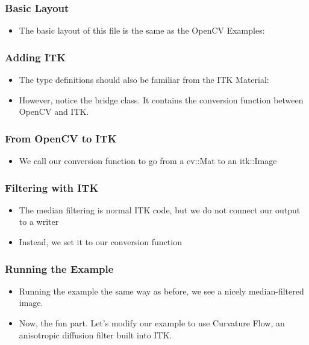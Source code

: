 \begin{frame}
\frametitle{Basic Layout}
\begin{itemize}
\item The basic layout of this file is the same as the OpenCV
  Examples:
\end{itemize}
\end{frame}

\begin{frame}
\frametitle{Adding ITK}
\begin{itemize}
\item The type definitions should also be familiar from the ITK Material:

\item However, notice the bridge class. It contains the conversion function
between OpenCV and ITK.
\end{itemize}
\end{frame}

\begin{frame}
\frametitle{From OpenCV to ITK}
\begin{itemize}
\item We call our conversion function to go from a cv::Mat to an
  itk::Image
\end{itemize}
\end{frame}

\begin{frame}
\frametitle{Filtering with ITK}
\begin{itemize}
\item The median filtering is normal ITK code, but we do not connect our
output to a writer
\pause
\item Instead, we set it to our conversion function
\end{itemize}
\end{frame}

\begin{frame}
\frametitle{Running the Example}
\begin{itemize}
\item Running the example the same way as before, we see a nicely
median-filtered image.
\pause
\item Now, the fun part. Let's modify our example to use Curvature Flow, an
anisotropic diffusion filter built into ITK.
\end{itemize}
\end{frame}

